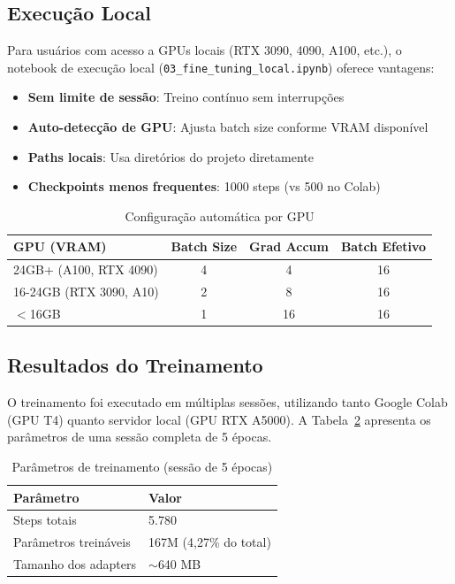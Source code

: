 \subsection{Execução Local}
\label{subsec:execucao-local}

Para usuários com acesso a GPUs locais (RTX 3090, 4090, A100, etc.), o notebook de execução local (\texttt{03\_fine\_tuning\_local.ipynb}) oferece vantagens:

\begin{itemize}
    \item \textbf{Sem limite de sessão}: Treino contínuo sem interrupções
    \item \textbf{Auto-detecção de GPU}: Ajusta batch size conforme VRAM disponível
    \item \textbf{Paths locais}: Usa diretórios do projeto diretamente
    \item \textbf{Checkpoints menos frequentes}: 1000 steps (vs 500 no Colab)
\end{itemize}

\begin{table}[H]
\centering
\caption{Configuração automática por GPU}
\label{tab:config-gpu-local}
\begin{tabular}{lccc}
\toprule
\textbf{GPU (VRAM)} & \textbf{Batch Size} & \textbf{Grad Accum} & \textbf{Batch Efetivo} \\
\midrule
24GB+ (A100, RTX 4090) & 4 & 4 & 16 \\
16-24GB (RTX 3090, A10) & 2 & 8 & 16 \\
$<$16GB & 1 & 16 & 16 \\
\bottomrule
\end{tabular}
\end{table}

\subsection{Resultados do Treinamento}
\label{subsec:resultados-treino}

O treinamento foi executado em múltiplas sessões, utilizando tanto Google Colab (GPU T4) quanto servidor local (GPU RTX A5000). A Tabela~\ref{tab:resultados-treino} apresenta os parâmetros de uma sessão completa de 5 épocas.

\begin{table}[H]
\centering
\caption{Parâmetros de treinamento (sessão de 5 épocas)}
\label{tab:resultados-treino}
\begin{tabular}{ll}
\toprule
\textbf{Parâmetro} & \textbf{Valor} \\
\midrule
Steps totais & 5.780 \\
Parâmetros treináveis & 167M (4,27\% do total) \\
Tamanho dos adapters & $\sim$640 MB \\
\bottomrule
\end{tabular}
\end{table}

